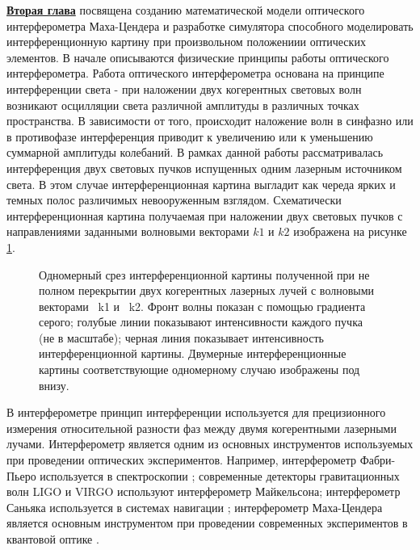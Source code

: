 \underline{\textbf{Вторая глава}} посвящена созданию математической модели оптического интерферометра Маха-Цендера и разработке симулятора способного моделировать интерференционную картину при произвольном положениии оптических элементов. В начале описываются физические принципы работы оптического интерферометра. Работа оптического интерферометра основана на принципе интерференции света - при наложении двух когерентных световых волн возникают осцилляции света различной амплитуды в различных точках пространства. В зависимости от того, происходит наложение волн в синфазно или в противофазе интерференция приводит к увеличению или к уменьшению суммарной амплитуды колебаний. В рамках данной работы рассматривалась интерференция двух световых пучков испущенных одним лазерным источником света. В этом случае интерференционная картина выгладит как череда ярких и темных полос различимых невооруженным взглядом. Схематически интерференционная картина получаемая при наложении двух световых пучков с направлениями заданными волновыми векторами $k1$ и $k2$ изображена на рисунке \ref{fig:two_beam_interf}.

\begin{figure}[ht]
    \caption{
     Одномерный срез интерференционной картины полученной при не полном перекрытии двух когерентных лазерных лучей с волновыми векторами ~k1 и ~k2. Фронт волны показан с помощью градиента серого; голубые линии показывают интенсивности каждого пучка (не в масштабе); черная линия показывает интенсивность интерференционной картины. Двумерные интерференционные картины соответствующие одномерному случаю изображены под внизу.}
\label{fig:two_beam_interf}
\end{figure}

В интерферометре принцип интерференции используется для прецизионного измерения относительной разности фаз между двумя когерентными лазерными лучами. Интерферометр является одним из основных инструментов используемых при проведении оптических экспериментов. Например, интерферометр Фабри-Пьеро используется в спектроскопии \cite{fabry-perot1899}; современные детекторы гравитационных волн LIGO и VIRGO \cite{LIGO, VIRGO} используют интерферометр Майкельсона; интерферометр Саньяка используется в системах навигации \cite{Kandpal2000}; интерферометр Маха-Цендера является основным инструментом при проведении современных экспериментов в квантовой оптике \cite{Ourjoumtsev2006, Sychev2017}.

